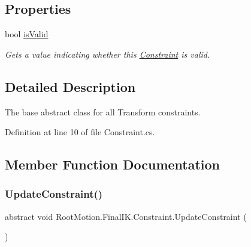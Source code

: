 \subsection*{Properties}
\begin{DoxyCompactItemize}
\item 
bool \mbox{\hyperlink{class_root_motion_1_1_final_i_k_1_1_constraint_a7ad56793e1a01e5b5b849011cb629300}{is\+Valid}}
\begin{DoxyCompactList}\small\item\em Gets a value indicating whether this \mbox{\hyperlink{class_root_motion_1_1_final_i_k_1_1_constraint}{Constraint}} is valid. \end{DoxyCompactList}\end{DoxyCompactItemize}


\subsection{Detailed Description}
The base abstract class for all Transform constraints. 



Definition at line 10 of file Constraint.\+cs.



\subsection{Member Function Documentation}
\mbox{\label{class_root_motion_1_1_final_i_k_1_1_constraint_a3abc634189f065586d8d57c653c22fdd}} 
\subsubsection{\texorpdfstring{Update\+Constraint()}{UpdateConstraint()}}
{\footnotesize\ttfamily abstract void Root\+Motion.\+Final\+I\+K.\+Constraint.\+Update\+Constraint (\begin{DoxyParamCaption}{ }\end{DoxyParamCaption})\hspace{0.3cm}{\ttfamily [pure virtual]}}




